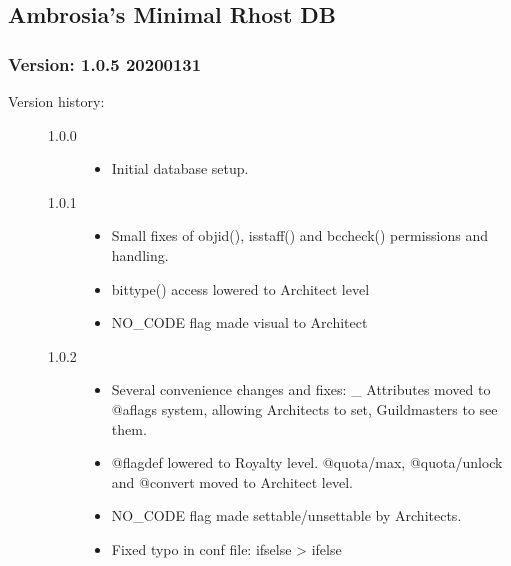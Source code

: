 \documentclass[letterpaper,10pt,english]{sphinxmanual}
\begin{document}
\subsection{Ambrosia’s Minimal Rhost DB}
\label{\detokenize{gettingstarted:ambrosia-s-minimal-rhost-db}}

\subsubsection{Version: 1.0.5          2020\sphinxhyphen{}01\sphinxhyphen{}31}
\label{\detokenize{gettingstarted:version-1-0-5-2020-01-31}}\begin{description}
\item[{Version history:}] \leavevmode\begin{description}
\item[{1.0.0}] \leavevmode\begin{itemize}
\item {} 
\sphinxAtStartPar
Initial database setup.

\end{itemize}

\item[{1.0.1}] \leavevmode\begin{itemize}
\item {} 
\sphinxAtStartPar
Small fixes of objid(), isstaff() and bccheck() permissions and handling.

\item {} 
\sphinxAtStartPar
bittype() access lowered to Architect level

\item {} 
\sphinxAtStartPar
NO\_CODE flag made visual to Architect

\end{itemize}

\item[{1.0.2}] \leavevmode\begin{itemize}
\item {} 
\sphinxAtStartPar
Several convenience changes and fixes: \_ Attributes moved to @aflags
system, allowing Architects to set, Guildmasters to see them.

\item {} 
\sphinxAtStartPar
@flagdef lowered to Royalty level. @quota/max, @quota/unlock and @convert
moved to Architect level.

\item {} 
\sphinxAtStartPar
NO\_CODE flag made settable/unsettable by Architects.

\item {} 
\sphinxAtStartPar
Fixed typo in conf file: ifselse \sphinxhyphen{}\textgreater{} ifelse


\end{itemize}
\end{description}
\end{description}
\end{document}

